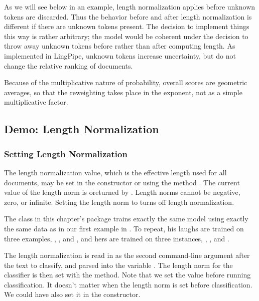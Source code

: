As we will see below in an example, length normalization applies
before unknown tokens are discarded.  Thus the behavior before and
after length normalization is different if there are unknown tokens
present.  The decision to implement things this way is rather
arbitrary; the model would be coherent under the decision to throw
away unknown tokens before rather than after computing length.  As
implemented in LingPipe, unknown tokens increase uncertainty, but
do not change the relative ranking of documents.  

Because of the multiplicative nature of probability, overall
scores are geometric averages, so that the reweighting takes place
in the exponent, not as a simple multiplicative factor.


\subsection{Demo: Length Normalization}

\subsubsection{Setting Length Normalization}

The length normalization value, which is the effective length used for
all documents, may be set in the constructor or using the method
.  The current value of the length norm is
oreturned by .  Length norms cannot be negative,
zero, or infinite.  Setting the length norm to  turns
off length normalization.

The class  in this chapter's package trains exactly
the same model using exactly the same data as in our first example in
.  To repeat, his laughs are trained on
three examples, , , and
, and hers are trained on three instances,
, , and
.  

The length normalization is read in as the second command-line
argument after the text to classify, and parsed into the 
variable .  The length norm for the classifier is
then set with the  method.  
%
%
Note that we set the value before running classification.  It
doesn't matter when the length norm is set before classification.
We could have also set it in the constructor.

